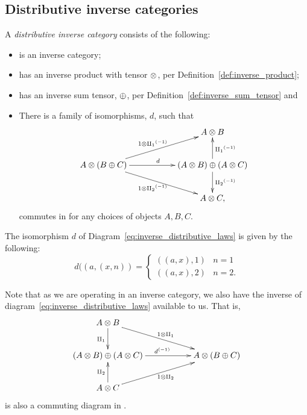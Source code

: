 \subsection{Distributive inverse categories} %
\label{sub:distributive_inverse_categories}
%
\begin{definition}\label{def:distributive_inverse_category}
  A \emph{distributive inverse category} \D consists of the following:
  \begin{itemize}
    \item \D is an inverse category;
    \item \D has an inverse product with tensor $\otimes$, per Definition~\ref{def:inverse_product};
    \item \D has an inverse sum tensor, $\oplus$, per Definition~\ref{def:inverse_sum_tensor} and
    \item There is a family of isomorphisms, $d$, such that
    \begin{equation}
      \xymatrix{
      && A\*B\\
      A \* (B \+ C) \ar[rr]^{d} \ar[urr]^{1\*\icpa} \ar[drr]_{1\*\icpb}
        && (A\*B) \+ (A \* C) \ar[u]_{\icpa} \ar[d]^{\icpb}\\
      && A\*C,
      }\label{eq:inverse_distributive_laws}
    \end{equation}
    commutes in \D for any choices of objects $A, B, C$.
  \end{itemize}
\end{definition}

\begin{example}
  The isomorphism $d$ of Diagram~\ref{eq:inverse_distributive_laws} is given by the following:
  \begin{equation}
    d((a,(x,n)) = \begin{cases}
      ((a,x),1) & n = 1\\
      ((a,x),2) & n = 2.
      \end{cases}\label{eq:pinj_distributive_isomporphism}
    \end{equation}
\end{example}
Note that as we are operating in an inverse category, we also have the inverse of
diagram~\ref{eq:inverse_distributive_laws} available to us. That is,
\begin{equation}
  \xymatrix{
  A\*B \ar[d]_{\cpa} \ar[drr]^{1\*\cpa}\\
  (A\*B) \+ (A \* C)  \ar[rr]^{\inv{d}}  &&A \* (B \+ C) \\
  A\*C\ar[u]^{\cpb} \ar[urr]_{1\*\cpb}
  }\label{eq:inverse_distributive_laws_reversed}
\end{equation}
is also a commuting diagram in \D.

